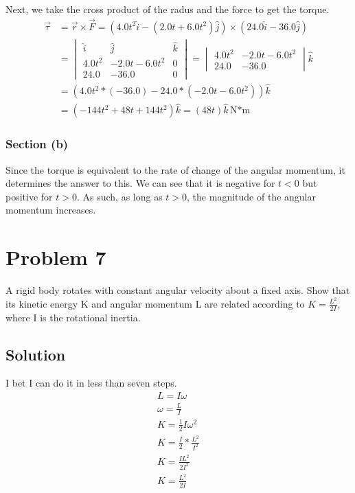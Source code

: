 \documentclass[12pt]{article}
\begin{document}
Next, we take the cross product of the radus and the force to get the torque.
\begin{align}
    \vec{\tau}  &=  \vec{r}\times\vec{F}
        =   \left(4.0t^2\hat{i} - \left(2.0t + 6.0t^2\right)\hat{j}\right) \times \left(24.0\hat{i} - 36.0\hat{j}\right)\\
        &=  \begin{vmatrix}
                \hat{i}&\hat{j}&\hat{k}\\
                4.0t^2&-2.0t - 6.0t^2&0\\
                24.0&-36.0&0
            \end{vmatrix}
        =   \begin{vmatrix}4.0t^2&-2.0t - 6.0t^2\\24.0&-36.0\end{vmatrix}\hat{k}\\
        &=  (4.0t^2*(-36.0) - 24.0*(-2.0t - 6.0t^2))\hat{k}\\
        &=  (-144t^2 + 48t + 144t^2)\hat{k}
        =   \boxed{(48t)\hat{k}\unit{\newton*\meter}}
\end{align}

\subsubsection{Section (b)}
Since the torque is equivalent to the rate of change of the angular momentum, it determines the answer to this. We can see that it is negative for $t<0$ but positive for $t>0$. As such, as long as $t > 0$, the magnitude of the angular momentum increases.


\pagebreak
\section{Problem 7}
A rigid body rotates with constant angular velocity about a fixed axis. Show that its kinetic energy K and angular momentum L are related according to $K = \frac{L^2}{2I}$, where I is the rotational inertia.

\subsection{Solution}
I bet I can do it in less than seven steps.
\begin{gather}
    L   =   I\omega\\
    \omega  =   \frac{L}{I}\\
    K   =   \frac{1}{2}I\omega^2\\
    K   =   \frac{I}{2}*\frac{L^2}{I^2}\\
    K   =   \frac{IL^2}{2I^2}\\
    \boxed{K   =   \frac{L^2}{2I}}
\end{gather}
\end{document}
